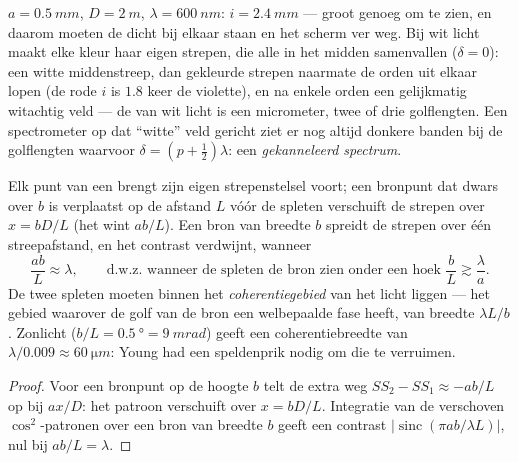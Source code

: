 \begin{example}\label{ex:b2:two-wave-interference:numbers}
$a = \qty{0.5}{mm}$, $D = \qty{2}{m}$, $\lambda = \qty{600}{nm}$:
$i = \qty{2.4}{mm}$ --- groot
genoeg om te zien, en daarom moeten de  dicht bij
elkaar staan en het scherm ver weg. Bij wit licht maakt elke kleur
haar eigen strepen, die alle in het midden samenvallen ($\delta = 0$): een
witte middenstreep, dan gekleurde strepen naarmate de orden uit elkaar
lopen (de rode $i$ is $1.8$ keer de violette), en na enkele orden een
gelijkmatig witachtig veld --- de  van wit licht is een
micrometer, twee of drie golflengten. Een spectrometer op dat ``witte''
veld gericht ziet er nog altijd donkere banden bij de golflengten
waarvoor $\delta = (p + \tfrac12)\lambda$: een \emph{gekanneleerd spectrum}.
\end{example}

\begin{proposition}\label{prop:b2:two-wave-interference:spatial}
Elk punt van een  brengt zijn eigen strepenstelsel
voort; een bronpunt dat dwars over $b$ is verplaatst op de afstand $L$
vóór de spleten verschuift de strepen over $x = bD/L$ (het 
wint $ab/L$). Een bron van breedte $b$ spreidt de strepen over één
streepafstand, en het contrast verdwijnt, wanneer
\[
\frac{ab}L \approx \lambda , \qquad\text{d.w.z.\ wanneer de spleten de bron
zien onder een hoek } \frac bL \gtrsim \frac\lambda a .
\]
De twee spleten moeten binnen het \emph{coherentiegebied} van het licht
liggen --- het gebied waarover de golf van de bron een welbepaalde fase
heeft, van breedte $\lambda L/b$. Zonlicht
($b/L = \qty{0.5}{\degree} = \qty{9}{mrad}$)
geeft een coherentiebreedte van $\lambda/0.009 \approx \qty{60}{\micro m}$:
Young had
een speldenprik nodig om die te verruimen.
\end{proposition}

\begin{proof}
Voor een bronpunt op de hoogte $b$ telt de extra weg $SS_2 - SS_1 \approx -ab/L$
op bij $ax/D$: het patroon verschuift over $x = bD/L$. Integratie van de
verschoven $\cos^2$-patronen over een bron van breedte $b$ geeft een contrast
$|\operatorname{sinc}(\pi ab/\lambda L)|$, nul bij $ab/L = \lambda$.
\end{proof}


